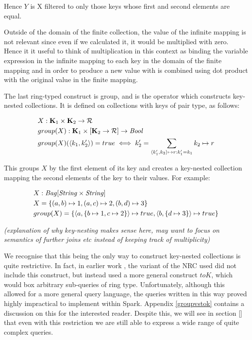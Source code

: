{{{Hence $Y$ is X filtered to only those keys whose first and second elements are equal.

Outside of the domain of the finite collection, the value of the infinite mapping is not relevant since even if we calculated it, it would be multiplied with zero. Hence it it useful to think of multiplication in this context as binding the variable expression in the infinite mapping to each key in the domain of the finite mapping and in order to produce a new value with is combined using dot product with the original value in the finite mapping.

The last ring-typed construct is group, and is the operator which constructs key-nested collections. It is defined on collections with keys of pair type, as follows:

\begin{equation*}
\begin{split}
&X: \mathbf{K}_1 \times \mathbf{K}_2 \rightarrow \mathcal{R} \\
&group(X): \mathbf{K}_1 \times [\mathbf{K}_2 \rightarrow \mathcal{R}] \rightarrow \textrm{\textit{Bool}} \\
&group(X)(\langle k_1, k_2' \rangle) = true \iff k_2' = \sum_{\langle k_1', k_2 \rangle \mapsto r : k_1' = k_1} {k_2 \mapsto r} 
\end{split}
\end{equation*}

This groups $X$ by the first element of its key and creates a key-nested collection mapping the second elements of the key to their values. For example:

\begin{equation*}
\begin{split}
&X: \textrm{\textit{Bag}}[\textrm{\textit{String}}\times \textrm{\textit{String}}] \\
&X = \{(a,b) \mapsto 1, (a, c) \mapsto 2, (b,d) \mapsto 3\} \\
&group(X) = \{\langle a, \{b \mapsto 1, c \mapsto 2\} \rangle \mapsto true, \langle b, \{d \mapsto 3 \} \rangle \mapsto true \}
\end{split}
\end{equation*}

\textit{(explanation of why key-nesting makes sense here, may want to focus on semantics of further joins etc instead of keeping track of multiplicity)}

We recognise that this being the only way to construct key-nested collections is quite restrictive. In fact, in earlier work \cite{draftpaper}, the variant of the NRC used did not include this construct, but instead used a more general construct $toK$, which would box arbitrary sub-queries of ring type. Unfortunately, although this allowed for a more general query language, the queries written in this way proved highly impractical to implement within Spark. Appendix \ref{groupvstok} contains a discussion on this for the interested reader. Despite this, we will see in section \ref{} that even with this restriction we are still able to express a wide range of quite complex queries.

}}}
